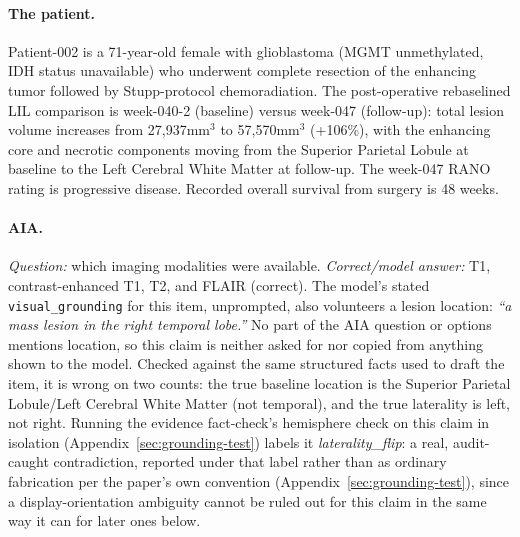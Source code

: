 \documentclass[11pt]{article}
\begin{document}
\paragraph{The patient.} Patient-002 is a 71-year-old female with glioblastoma (MGMT unmethylated, IDH status unavailable) who underwent complete resection of the enhancing tumor followed by Stupp-protocol chemoradiation. The post-operative rebaselined LIL comparison is week-040-2 (baseline) versus week-047 (follow-up): total lesion volume increases from 27,937mm$^3$ to 57,570mm$^3$ (+106\%), with the enhancing core and necrotic components moving from the Superior Parietal Lobule at baseline to the Left Cerebral White Matter at follow-up. The week-047 RANO rating is progressive disease. Recorded overall survival from surgery is 48 weeks.

\paragraph{AIA.} \emph{Question:} which imaging modalities were available. \emph{Correct/model answer:} T1, contrast-enhanced T1, T2, and FLAIR (correct). The model's stated \texttt{visual\_grounding} for this item, unprompted, also volunteers a lesion location: \textit{``a mass lesion in the right temporal lobe.''} No part of the AIA question or options mentions location, so this claim is neither asked for nor copied from anything shown to the model. Checked against the same structured facts used to draft the item, it is wrong on two counts: the true baseline location is the Superior Parietal Lobule/Left Cerebral White Matter (not temporal), and the true laterality is left, not right. Running the evidence fact-check's hemisphere check on this claim in isolation (Appendix~\ref{sec:grounding-test}) labels it \emph{laterality\_flip}: a real, audit-caught contradiction, reported under that label rather than as ordinary fabrication per the paper's own convention (Appendix~\ref{sec:grounding-test}), since a display-orientation ambiguity cannot be ruled out for this claim in the same way it can for later ones below.
\end{document}
